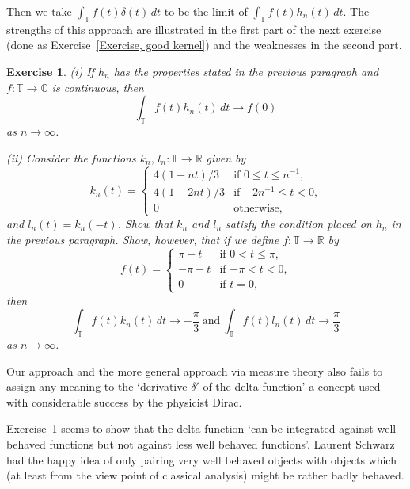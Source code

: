 \documentclass[12pt]{article}
\newtheorem{exercise}[theorem]{Exercise}
\theoremstyle{definition}
\begin{document}
\noindent Then we take $\int_{\mathbb T} f(t)\delta (t)\,dt$
to be the limit of $\int_{\mathbb T} f(t)h_{n}(t)\,dt$.
The strengths of this approach are illustrated in the first
part of the next exercise (done as Exercise~\ref{Exercise, good kernel})
and the weaknesses in the second part.
\begin{exercise}\label{example delta}
(i) If $h_{n}$ has the properties
stated in the previous paragraph and
$f:{\mathbb T}\rightarrow{\mathbb C}$ is continuous, then
\[\int_{\mathbb T} f(t)h_{n}(t)\,dt\rightarrow f(0)\]
as $n\rightarrow\infty$.

(ii) Consider the functions
$k_{n},\,l_{n}:{\mathbb T}\rightarrow{\mathbb R}$
given by
\begin{equation*}
k_{n}(t)=
\begin{cases}
4(1-nt)/3&\text{if $0\leq t\leq n^{-1}$,}\\
4(1-2nt)/3&\text{if $-2n^{-1}\leq t<0$,}\\
0&\text{otherwise,}
\end{cases}
\end{equation*}
and $l_{n}(t)=k_{n}(-t)$.
Show that $k_{n}$ and $l_{n}$
satisfy the condition placed on $h_{n}$
in the previous paragraph. Show, however,
that if we define $f:{\mathbb T}\rightarrow{\mathbb R}$
by
\begin{equation*}
f(t)=
\begin{cases}
\pi-t&\text{if $0<t\leq \pi$,}\\
-\pi-t&\text{if $-\pi<t<0$,}\\
0&\text{if $t=0$,}
\end{cases}
\end{equation*}
then
\[\int_{\mathbb T} f(t)k_{n}(t)\,dt\rightarrow
-\frac{\pi}{3}\ \text{and}
\ \int_{\mathbb T} f(t)l_{n}(t)\,dt\rightarrow
\frac{\pi}{3}\]
as $n\rightarrow \infty$.
\end{exercise}
Our approach and the more general approach via measure
theory also fails to assign any meaning to the
`derivative $\delta'$ of the delta function' a concept
used with considerable success by the physicist Dirac.

Exercise~\ref{example delta} seems to show that the
delta function `can be integrated against well behaved
functions but not against less well behaved functions'.
Laurent Schwarz had the happy idea of only pairing
very well behaved objects with objects which
(at least from the view point of classical analysis)
might be rather badly behaved.
\end{document}
